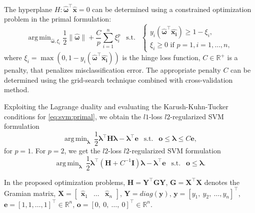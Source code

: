 \documentclass{aip-cp}
\DeclareMathOperator*{\argmin}{arg\,min}
\begin{document}
The hyperplane $H: \boldsymbol{\widehat{\omega}}^\top\boldsymbol{\widehat{x}}=0$ can be determined using a constrained optimization problem in the primal formulation:
\begin{equation}
    \argmin_{\boldsymbol{\widehat{\omega}},\xi_i} \frac{1}{2}\|\boldsymbol{\widehat{\omega}}\| + \frac{C}{p}\sum_{i = 1}^n\xi_i^p ~~\text{ s.t. } ~~
    \begin{cases}
        y_i(\boldsymbol{\widehat{\omega}}^\top\boldsymbol{\widehat{x_i}})\geq1 - \xi_i,\\
        \xi_i \geq 0 \text{ if } p=1, i=1, ...,n,
    \end{cases}
    \label{eq:svm:primal}
\end{equation}
where $\xi_i = \max(0, 1-y_i(\boldsymbol{\widehat{\omega}}^\top\boldsymbol{\widehat{x_i}}))$ is the hinge loss function, $C \in \mathbb{R}^+$ is a penalty, that penalizes misclassification error. The appropriate penalty $C$ can be determined using the grid-search technique combined with cross-validation method.

Exploiting the Lagrange duality and evaluating the Karush-Kuhn-Tucker conditions for \eqref{eq:svm:primal},
we obtain the $l1$-loss $l2$-regularized SVM formulation
\begin{equation}
    \argmin_{\boldsymbol{\lambda}} \ \frac{1}{2} \boldsymbol{\lambda}^\top \boldsymbol{H}  \boldsymbol{\lambda} -  \boldsymbol{\lambda}^\top \boldsymbol{e} ~~\text{ s.t. }~~ \boldsymbol{o} \leq  \boldsymbol{\lambda} \leq C\boldsymbol{e},
    \label{eq:svm:dualL1}
\end{equation}
for $p=1$. For $p=2$, we get the $l2$-loss $l2$-regularized SVM formulation
\begin{equation}
    \argmin_{\boldsymbol{\lambda}} \ \frac{1}{2} \boldsymbol{\lambda}^\top \left(\boldsymbol{H} + C^{-1} \boldsymbol{I} \right) \boldsymbol{\lambda} -  \boldsymbol{\lambda}^\top \boldsymbol{e} ~~\text{ s.t. }~~    \boldsymbol{o} \leq  \boldsymbol{\lambda}.
    \label{eq:svm:dualL2}
\end{equation}

In the proposed optimization problems, $\boldsymbol{H} = \boldsymbol{Y}^\top \boldsymbol{G} \boldsymbol{Y}$, $\boldsymbol{G} = \boldsymbol{X}^\top\boldsymbol{X}$ denotes the Gramian matrix, $\boldsymbol{X}= \begin{bmatrix} \boldsymbol{\widehat{x}}_1 & \dots & \boldsymbol{\widehat{x}}_n \end{bmatrix}$, $\boldsymbol{Y} = diag(\boldsymbol{y})$, $\boldsymbol{y} = \left[y_1, \ y_2, \  \dots, y_n\right]^\top$, $\boldsymbol{e} = \left[1, 1, \dots, 1\right]^\top \in \mathbb{R}^n$, $\boldsymbol{o} = \left[0, \ 0,  \ \dots, \ 0\right]^\top \in \mathbb{R}^n$.
\end{document}
